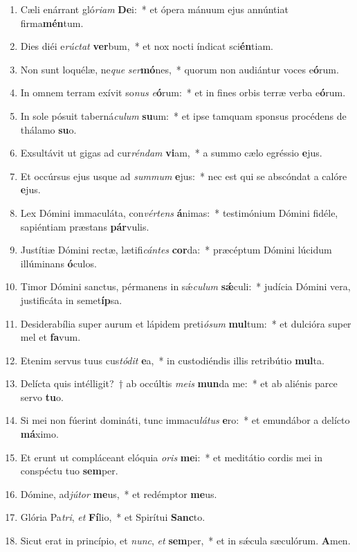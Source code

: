 \documentclass[twoside]{article}
\begin{document}
\begin{paracol}[1]{2}
\begin{enumerate}[wide, itemsep=0mm, labelwidth=!, labelindent=0pt, label=\color{gregoriocolor}\theenumi]
\item Cæli enárrant gló\textit{ri}\textit{am} \textbf{De}i:~* et ópera mánuum ejus annúntiat firma\textbf{mén}tum.
\item Dies diéi e\textit{rúc}\textit{tat} \textbf{ver}bum,~* et nox nocti índicat sci\textbf{én}tiam.
\item Non sunt loquélæ, ne\textit{que} \textit{ser}\textbf{mó}nes,~* quorum non audiántur voces e\textbf{ó}rum.
\item In omnem terram exívit so\textit{nus} \textit{e}\textbf{ó}rum:~* et in fines orbis terræ verba e\textbf{ó}rum.
\item In sole pósuit taberná\textit{cu}\textit{lum} \textbf{su}um:~* et ipse tamquam sponsus procédens de thálamo \textbf{su}o.
\item Exsultávit ut gigas ad cur\textit{rén}\textit{dam} \textbf{vi}am,~* a summo cælo egréssio \textbf{e}jus.
\item Et occúrsus ejus usque ad \textit{sum}\textit{mum} \textbf{e}jus:~* nec est qui se abscóndat a calóre \textbf{e}jus.
\item Lex Dómini immaculáta, con\textit{vér}\textit{tens} \textbf{á}nimas:~* testimónium Dómini fidéle, sapiéntiam præstans \textbf{pár}vulis.
\item Justítiæ Dómini rectæ, lætifi\textit{cán}\textit{tes} \textbf{cor}da:~* præcéptum Dómini lúcidum illúminans \textbf{ó}culos.
\item Timor Dómini sanctus, pérmanens in sǽ\textit{cu}\textit{lum} \textbf{sǽ}culi:~* judícia Dómini vera, justificáta in semet\textbf{íp}sa.
\item Desiderabília super aurum et lápidem preti\textit{ó}\textit{sum} \textbf{mul}tum:~* et dulcióra super mel et \textbf{fa}vum.
\item Etenim servus tuus cus\textit{tó}\textit{dit} \textbf{e}a,~* in custodiéndis illis retribútio \textbf{mul}ta.
\item Delícta quis intélligit?~† ab occúltis \textit{me}\textit{is} \textbf{mun}da me:~* et ab aliénis parce servo \textbf{tu}o.
\item Si mei non fúerint domináti, tunc immacu\textit{lá}\textit{tus} \textbf{e}ro:~* et emundábor a delícto \textbf{má}ximo.
\item Et erunt ut compláceant elóquia \textit{o}\textit{ris} \textbf{me}i:~* et meditátio cordis mei in conspéctu tuo \textbf{sem}per.
\item Dómine, ad\textit{jú}\textit{tor} \textbf{me}us,~* et redémptor \textbf{me}us.
\item Glória Pa\textit{tri}, \textit{et} \textbf{Fí}lio,~* et Spirítui \textbf{Sanc}to.
\item Sicut erat in princípio, et \textit{nunc}, \textit{et} \textbf{sem}per,~* et in sǽcula sæculórum. \textbf{A}men.
\end{enumerate}


\end{paracol}
\end{document}
